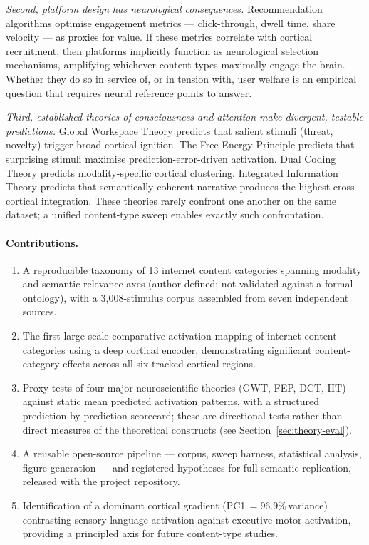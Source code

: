 \documentclass[11pt,letterpaper]{article}
\begin{document}
\textit{Second, platform design has neurological consequences.} Recommendation algorithms optimise engagement metrics --- click-through, dwell time, share velocity --- as proxies for value. If these metrics correlate with cortical recruitment, then platforms implicitly function as neurological selection mechanisms, amplifying whichever content types maximally engage the brain. Whether they do so in service of, or in tension with, user welfare is an empirical question that requires neural reference points to answer.

\textit{Third, established theories of consciousness and attention make divergent, testable predictions.} Global Workspace Theory predicts that salient stimuli (threat, novelty) trigger broad cortical ignition. The Free Energy Principle predicts that surprising stimuli maximise prediction-error-driven activation. Dual Coding Theory predicts modality-specific cortical clustering. Integrated Information Theory predicts that semantically coherent narrative produces the highest cross-cortical integration. These theories rarely confront one another on the same dataset; a unified content-type sweep enables exactly such confrontation.

\paragraph{Contributions.}
\begin{enumerate}[leftmargin=1.4em,itemsep=2pt,topsep=2pt]
\item A reproducible taxonomy of 13 internet content categories spanning modality and semantic-relevance axes (author-defined; not validated against a formal ontology), with a 3{,}008-stimulus corpus assembled from seven independent sources.
\item The first large-scale comparative activation mapping of internet content categories using a deep cortical encoder, demonstrating significant content-category effects across all six tracked cortical regions.
\item Proxy tests of four major neuroscientific theories (GWT, FEP, DCT, IIT) against static mean predicted activation patterns, with a structured prediction-by-prediction scorecard; these are directional tests rather than direct measures of the theoretical constructs (see Section~\ref{sec:theory-eval}).
\item A reusable open-source pipeline --- corpus, sweep harness, statistical analysis, figure generation --- and registered hypotheses for full-semantic replication, released with the project repository.
\item Identification of a dominant cortical gradient (PC1\,$= 96.9\%$\,variance) contrasting sen\-sory-language activation against executive-motor activation, providing a principled axis for future content-type studies.
\end{enumerate}
\end{document}
